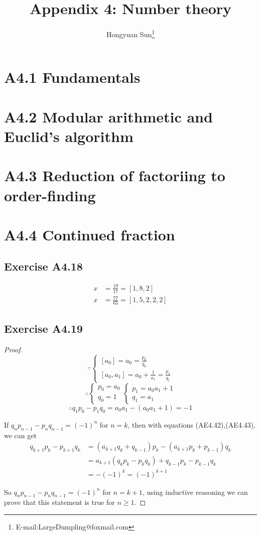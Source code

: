 \documentclass{article}
\title{Appendix 4: Number theory}
\author{Hongyuan Sun\thanks{E-mail:LargeDumpling@foxmail.com}}
\begin{document}
\maketitle
\section*{A4.1 Fundamentals}

\section*{A4.2 Modular arithmetic and Euclid's algorithm}

\section*{A4.3 Reduction of factoriing to order-finding}

\section*{A4.4 Continued fraction}
	\subsection*{Exercise A4.18}
	\begin{align*}
		x &= \frac{19}{17} = [1,8,2] \tag{AE4.18-1} \\
		x &= \frac{77}{65} = [1,5,2,2,2] \tag{AE4.18-2}
	\end{align*}
	
	\subsection*{Exercise A4.19}
	\begin{proof}
		\[ \because \begin{cases}
			[a_0] = a_0 = \frac{p_0}{q_0} \\
			[a_0,a_1] = a_0 + \frac{1}{a_1} = \frac{p_1}{q_1} \tag{AE4.19-1}
		\end{cases} \]
		\[ \therefore \begin{cases}
			p_0 = a_0 \\
			q_0 = 1
		\end{cases} \begin{cases}
			p_1 = a_0a_1 + 1 \\
			q_1 = a_1 \tag{AE4.19-2}
		\end{cases} \]
		\[ \therefore q_1p_0 - p_1q_0 = a_0a_1 - (a_0a_1+1) = -1 \]

		If $q_np_{n-1} - p_nq_{n-1} = (-1)^n$ for $n=k$, then with equations (AE4.42),(AE4.43), we can get
		\begin{align*}
			q_{k+1}p_k - p_{k+1}q_k
			&= (a_{k+1}q_k + q_{k-1})p_k - (a_{k+1}p_k + p_{k-1})q_k \tag{AE4.19-3} \\
			&= a_{k+1}(q_kp_k - p_kq_k)+q_{k-1}p_k - p_{k-1}q_k \tag{AE4.19-4} \\
			&= - (-1)^k = (-1)^{k+1} \tag{AE4.19-5}
		\end{align*}

		So $q_np_{n-1} - p_nq_{n-1} = (-1)^n$ for $n=k+1$, using inductive reasoning we can prove that this statement is true for $n \geqslant 1$.
	\end{proof}
\end{document}
